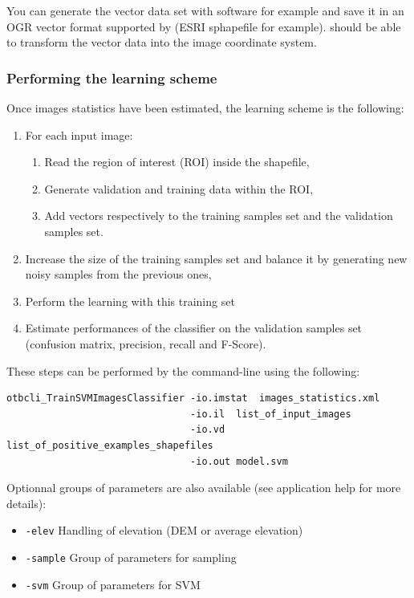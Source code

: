 You can generate the vector data set with \qgis software for
example and save it in an OGR vector format supported by \gdal (ESRI
sphapefile for example). \app should be able to transform the
vector data into the image coordinate system.

\subsubsection{Performing the learning scheme}

Once images statistics have been estimated, the learning scheme is the following:
\begin{enumerate}
  \item For each input image:
  \begin{enumerate}
    \item Read the region of interest (ROI) inside the shapefile,
    \item Generate validation and training data within the ROI,
    \item Add vectors respectively to the training samples set and the validation 
    samples set.
  \end{enumerate}
  \item Increase the size of the training samples set and balance it by 
  generating new noisy samples from the previous ones,
  \item Perform the learning with this training set
  \item Estimate performances of the classifier on the validation samples set 
  (confusion matrix, precision, recall and F-Score).
\end{enumerate}

These steps can be performed by the  
command-line using the following:

\begin{verbatim}
otbcli_TrainSVMImagesClassifier -io.imstat  images_statistics.xml 
                                -io.il  list_of_input_images 
                                -io.vd  list_of_positive_examples_shapefiles
                                -io.out model.svm
\end{verbatim}

Optionnal groups of parameters are also available (see application help for 
more details):
\begin{itemize}
\item \verb?-elev? Handling of elevation (DEM or average elevation)
\item \verb?-sample? Group of parameters for sampling
\item \verb?-svm? Group of parameters for SVM
\end{itemize}

